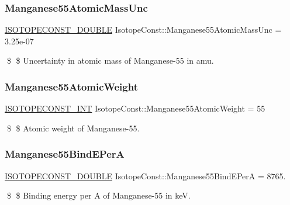 \subsubsection{\texorpdfstring{Manganese55\+Atomic\+Mass\+Unc}{Manganese55AtomicMassUnc}}
{\footnotesize\ttfamily \mbox{\hyperlink{group___isotope_const-_macros_ga8f45a7272ce02c0b4c65c44636ed719a}{I\+S\+O\+T\+O\+P\+E\+C\+O\+N\+S\+T\+\_\+\+D\+O\+U\+B\+LE}} Isotope\+Const\+::\+Manganese55\+Atomic\+Mass\+Unc = 3.\+25e-\/07}

\$ \$ Uncertainty in atomic mass of Manganese-\/55 in amu. \mbox{\label{group___isotope_const-_manganese-_mn55_ga6520ab999efbf8fc8cb4a264ca30e8a4}} 
\subsubsection{\texorpdfstring{Manganese55\+Atomic\+Weight}{Manganese55AtomicWeight}}
{\footnotesize\ttfamily \mbox{\hyperlink{group___isotope_const-_macros_ga5f18360b3e99483a35c32d789e62621c}{I\+S\+O\+T\+O\+P\+E\+C\+O\+N\+S\+T\+\_\+\+I\+NT}} Isotope\+Const\+::\+Manganese55\+Atomic\+Weight = 55}

\$ \$ Atomic weight of Manganese-\/55. \mbox{\label{group___isotope_const-_manganese-_mn55_ga11304818b8f91254a830fcf2d5eefb32}} 
\subsubsection{\texorpdfstring{Manganese55\+Bind\+E\+PerA}{Manganese55BindEPerA}}
{\footnotesize\ttfamily \mbox{\hyperlink{group___isotope_const-_macros_ga8f45a7272ce02c0b4c65c44636ed719a}{I\+S\+O\+T\+O\+P\+E\+C\+O\+N\+S\+T\+\_\+\+D\+O\+U\+B\+LE}} Isotope\+Const\+::\+Manganese55\+Bind\+E\+PerA = 8765.}

\$ \$ Binding energy per A of Manganese-\/55 in keV. \mbox{\label{group___isotope_const-_manganese-_mn55_ga102b55198cfcedf0b31838ef6c50a8e1}} 
